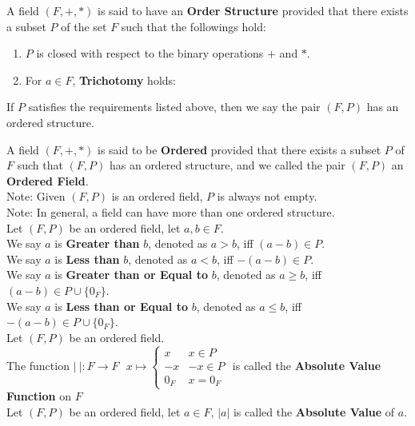 \documentclass[11pt]{article}
\newcommand{\note}{\color{gray}Note: \color{black}}
\begin{document}
		\noindent A field $(F,+,\ast)$ is said to have an \textbf{Order Structure} provided that there exists a subset $P$ of the set $F$ such that the followings hold:
		\begin{enumerate}[topsep=3pt,itemsep=-1ex,partopsep=1ex,parsep=1ex]
			\item $P$ is closed with respect to the binary operations $+$ and $\ast$.
			\item For $a \in F$, \textbf{Trichotomy} holds: \ \ \ \
		\end{enumerate}
		If $P$ satisfies the requirements listed above, then we say the pair $(F,P)$ has an ordered structure.
	
		\hfill\break
		\noindent A field $(F,+,\ast)$ is said to be \textbf{Ordered} provided that there exists a subset $P$ of $F$ such that $(F,P)$ has an ordered structure, and we called the pair $(F,P)$ an \textbf{Ordered Field}.\\
		\note Given $(F,P)$ is an ordered field, $P$ is always not empty.\\
		\note In general, a field can have more than one ordered structure.\\
	
		\noindent Let $(F,P)$ be an ordered field, let $a,b \in F$.\\
		We say $a$ is \textbf{Greater than} $b$, denoted as $a>b$, iff $(a-b)\in P$.\\
		We say $a$ is \textbf{Less than} $b$, denoted as $a<b$, iff $-(a-b)\in P$.\\
		We say $a$ is \textbf{Greater than or Equal to} $b$, denoted as $a \geq b$, iff $(a-b)\in P \cup \{0_F\}$.\\
		We say $a$ is \textbf{Less than or Equal to} $b$, denoted as $a \leq b$, iff $-(a-b)\in P \cup \{0_F\}$.\\
	
		\noindent Let $(F,P)$ be an ordered field.
		\\The function $| \ |: F \to F \ \ \ x \mapsto \begin{cases} x & x \in P \\ -x & -x \in P \\ 0_F & x=0_F \end{cases}$ is called the \textbf{Absolute Value Function} on $F$\\ 
		\hfill\break
		\hfill\break
		\noindent Let $(F,P)$ be an ordered field, let $a \in F$,  $|a|$ is called the \textbf{Absolute Value} of $a$.\\
		
\end{document}
